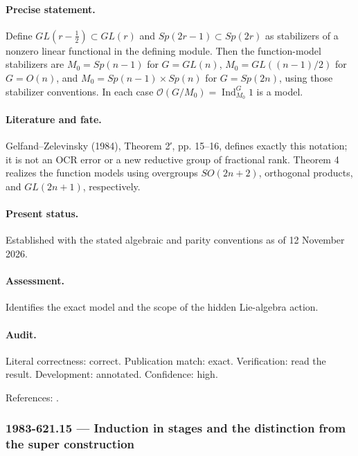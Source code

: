 \paragraph{Precise statement.} Define \(GL(r-\tfrac12)\subset GL(r)\) and \(Sp(2r-1)\subset Sp(2r)\) as stabilizers of a nonzero linear functional in the defining module. Then the function-model stabilizers are \(M_0=Sp(n-1)\) for \(G=GL(n)\), \(M_0=GL((n-1)/2)\) for \(G=O(n)\), and \(M_0=Sp(n-1)\times Sp(n)\) for \(G=Sp(2n)\), using those stabilizer conventions. In each case \(\mathcal O(G/M_0)=\operatorname{Ind}_{M_0}^G1\) is a model.

\paragraph{Literature and fate.} Gelfand–Zelevinsky (1984), Theorem 2′, pp. 15–16, defines exactly this notation; it is not an OCR error or a new reductive group of fractional rank. Theorem 4 realizes the function models using overgroups \(SO(2n+2)\), orthogonal products, and \(GL(2n+1)\), respectively.

\paragraph{Present status.} Established with the stated algebraic and parity conventions as of 12 November 2026.

\paragraph{Assessment.} Identifies the exact model and the scope of the hidden Lie-algebra action.

\paragraph{Audit.} Literal correctness: correct. Publication match: exact. Verification: read the result. Development: annotated. Confidence: high.

\noindent References: \citep{gelfandzelevinsky1984models}.\par

\subsubsection{1983-621.15 --- Induction in stages and the distinction from the super construction}

\label{item:1983-621.15}

